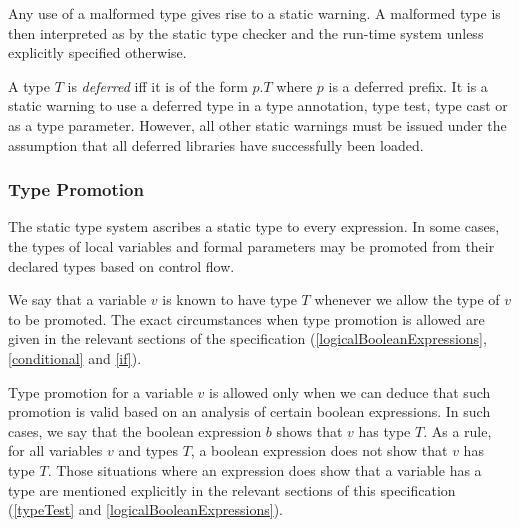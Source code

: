 \documentclass{article}
\begin{document}
\LMHash{}
 Any use of a malformed  type gives rise to a static warning. A malformed type is then interpreted as \DYNAMIC{} by the static type checker and the run-time system unless explicitly specified otherwise.


\LMHash{}
A type $T$ is {\em deferred} iff it is of the form $p.T$ where $p$ is a deferred prefix.
It is a static warning to use a deferred type in a type annotation, type test, type cast or as a type parameter. However, all other static warnings must be issued under the assumption that all deferred libraries have successfully been loaded.



\subsubsection{Type Promotion}

\LMHash{}
The static type system ascribes a static type to every expression.  In some cases, the types of local variables and formal parameters may be promoted from their declared types based on control flow.

\LMHash{}
We say that a variable $v$ is known to have type $T$ whenever we allow the type of $v$ to be promoted. The exact circumstances when type promotion is allowed are given in the relevant sections of the specification (\ref{logicalBooleanExpressions}, \ref{conditional} and \ref{if}).

\LMHash{}
Type promotion for a variable $v$ is allowed only when we can deduce that such promotion is valid based on an analysis of certain boolean expressions. In such cases, we say that the boolean expression $b$ shows that $v$ has type $T$. As a rule, for all variables $v$ and types $T$, a boolean expression does not show that $v$ has type $T$. Those situations where an expression does show that a variable has a type are mentioned explicitly in the relevant sections of this specification (\ref{typeTest} and \ref{logicalBooleanExpressions}).
\end{document}
